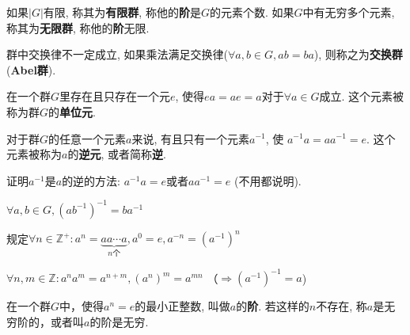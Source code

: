\begin{Definition}[群的阶]
如果$|G|$有限, 称其为\textbf{有限群}, 称他的\textbf{阶}是$G$的元素个数. 
如果$G$中有无穷多个元素, 称其为\textbf{无限群}, 称他的\textbf{阶}无限.
\end{Definition}

\begin{Definition}
群中交换律不一定成立, 如果乘法满足交换律($\forall a, b \in G, ab = ba$), 则称之为\textbf{交换群}(\textbf{Abel群}).
\end{Definition}

\begin{Theorem}[单位元]
在一个群$G$里存在且只存在一个元$e$, 使得$ea = ae = a$对于$\forall a \in G$成立. 这个元素被称为群$G$的\textbf{单位元}.
\end{Theorem}

\begin{Theorem}[逆元]
对于群$G$的任意一个元素$a$来说, 有且只有一个元素$a^{-1}$, 
使 $a^{-1} a = a a^{-1} = e$. 这个元素被称为$a$的\textbf{逆元}, 或者简称\textbf{逆}.
\end{Theorem}

\begin{Note}
证明$a^{-1}$是$a$的逆的方法: $a^{-1}a = e$或者$aa^{-1} = e$ (不用都说明).
\end{Note}

\begin{Property}[乘积的逆等于逆的乘积]
$\forall a, b \in G, {(ab^{-1})}^{-1} = b a^{-1}$
\end{Property}

\begin{Definition}
规定$\forall n \in \mathbb{Z}^{+}: a^n = \underbrace{a a \cdots a}_{n\text{个}}, a^0 = e, a^{-n} = (a^{-1})^n$
\end{Definition}

\begin{Proposition}
$ \forall n, m \in \mathbb{Z}: a^n a^m = a^{n+m}, {(a^n)}^m = a^{mn} $ （{$\Rightarrow {(a^{-1})}^{-1} = a$})
\end{Proposition}

\begin{Definition}[元素的阶]
在一个群$G$中，使得$a^n = e$的最小正整数, 叫做$a$的\textbf{阶}. 若这样的$n$不存在, 称$a$是无穷阶的，或者叫$a$的阶是无穷.
\end{Definition}


